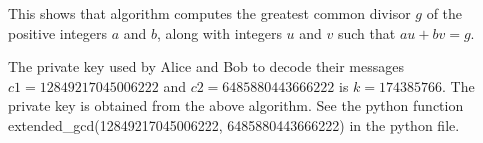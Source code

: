 \documentclass[12pt]{ut-thesis}
\theoremstyle{definition}
\begin{document}
		This shows that algorithm computes the greatest common divisor \( g \) of the positive integers \( a \) and \( b \), along with integers \( u \) and \( v \) such that \( au + bv = g \).
		
		
		
		
		
		
		The private key used by Alice and Bob to decode their messages $c1 = 12849217045006222$ and $c2 = 6485880443666222$ is $k = 174385766$. The private key is obtained from the above algorithm. See the python function extended\_gcd(12849217045006222, 6485880443666222) in the python file. 	
\end{document}
